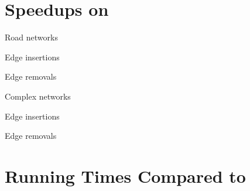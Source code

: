\section{Speedups on \dynmwmrandom}
\label{apx:dyn-mwm:rw-speedups}
%
\begin{table}[H]
\centering\footnotesize
{}
\label{tab:dyn-mwm:speed-rw}
\begin{subtable}[t]{\textwidth}
\caption{Road networks}
\begin{subtable}[t]{.5\textwidth}
\centering
Edge insertions


\end{subtable}\hfill
\begin{subtable}[t]{.5\textwidth}
\centering
Edge removals


\end{subtable}
\end{subtable}\bigskip

\begin{subtable}[t]{\textwidth}
\centering\footnotesize
\caption{Complex networks}
\begin{subtable}[t]{.5\textwidth}
\centering
Edge insertions


\end{subtable}\hfill
\begin{subtable}[t]{.5\textwidth}
\centering
Edge removals


\end{subtable}
\end{subtable}
\end{table}\vfill\pagebreak


\section{Running Times Compared to \dynmwmrandom}
\label{apx:dyn-mwm:rw-time}

